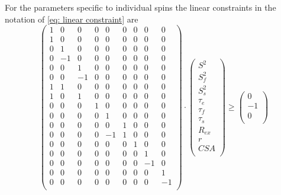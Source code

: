 \begin{htmlonly}
\begin{htmlonly}
For the parameters specific to individual spins the linear constraints in the notation of \eqref{eq: linear constraint} are
\begin{equation}
    \begin{pmatrix}
        1 & 0 & 0 & 0 & 0 & 0 & 0 & 0 & 0 \\
        1 & 0 & 0 & 0 & 0 & 0 & 0 & 0 & 0 \\
        0 & 1 & 0 & 0 & 0 & 0 & 0 & 0 & 0 \\
        0 &-1 & 0 & 0 & 0 & 0 & 0 & 0 & 0 \\
        0 & 0 & 1 & 0 & 0 & 0 & 0 & 0 & 0 \\
        0 & 0 &-1 & 0 & 0 & 0 & 0 & 0 & 0 \\
        1 & 1 & 0 & 0 & 0 & 0 & 0 & 0 & 0 \\
        1 & 0 & 1 & 0 & 0 & 0 & 0 & 0 & 0 \\
        0 & 0 & 0 & 1 & 0 & 0 & 0 & 0 & 0 \\
        0 & 0 & 0 & 0 & 1 & 0 & 0 & 0 & 0 \\
        0 & 0 & 0 & 0 & 0 & 1 & 0 & 0 & 0 \\
        0 & 0 & 0 & 0 &-1 & 1 & 0 & 0 & 0 \\
        0 & 0 & 0 & 0 & 0 & 0 & 1 & 0 & 0 \\
        0 & 0 & 0 & 0 & 0 & 0 & 0 & 1 & 0 \\
        0 & 0 & 0 & 0 & 0 & 0 & 0 &-1 & 0 \\
        0 & 0 & 0 & 0 & 0 & 0 & 0 & 0 & 1 \\
        0 & 0 & 0 & 0 & 0 & 0 & 0 & 0 &-1 \\
    \end{pmatrix}
    \cdot
    \begin{pmatrix}
        S^2 \\
        S^2_f \\
        S^2_s \\
        \tau_e \\
        \tau_f \\
        \tau_s \\
        R_{ex} \\
         r \\
        CSA \\
    \end{pmatrix}
    \geqslant
    \begin{pmatrix}
        0 \\
        -1 \\
        0 \\

\end{pmatrix}
\end{equation}
\end{htmlonly}
\end{htmlonly}
